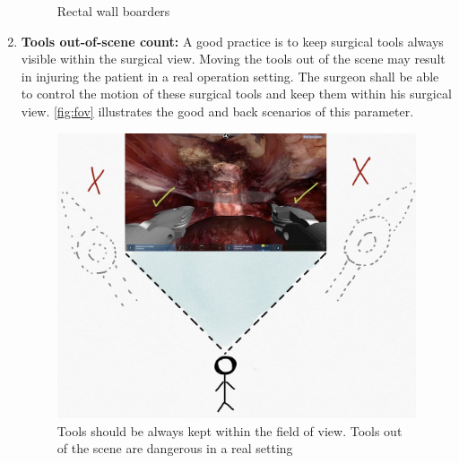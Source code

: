 \begin{enumerate}[start=1,label={Para \#\arabic*, }]
\begin{figure}
  \centering%
  \hfill%
  \caption{Rectal wall boarders}
  \label{fig:recWalls}
\end{figure}

	\item \textbf{Tools out-of-scene count:} A good practice is to keep surgical tools always visible within the surgical view. Moving the tools out of the scene may result in injuring the patient in a real operation setting. The surgeon shall be able to control the motion of these surgical tools and keep them within his surgical view. \autoref{fig:fov} illustrates the good and back scenarios of this parameter.

  \begin{figure}
    \centering
    \includegraphics[width=.6\textwidth,frame]{figures/validation/fov.JPG}
    \caption{Tools should be always kept within the field of view. Tools out of the scene are dangerous in a real setting}
    \label{fig:fov}
  \end{figure}


\end{enumerate}
